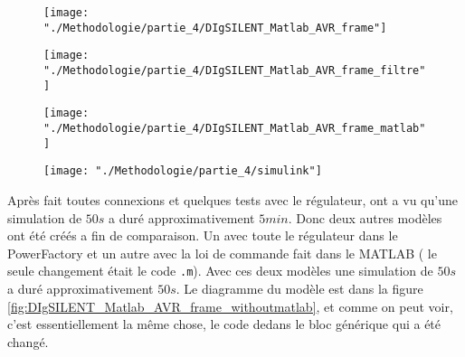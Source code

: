 \begin{minipage}{.475\textwidth}
	\begin{figure}[H]
		\begin{center}	
			\texttt{[image: "./Methodologie/partie\_4/DIgSILENT\_Matlab\_AVR\_frame"]}
			\caption{}
			\label{fig:DIgSILENT_Matlab_AVR_frame}
		\end{center}
	\end{figure}
\end{minipage}
\begin{minipage}{.475\textwidth}
	\begin{figure}[H]
		\begin{center}	
			\texttt{[image: "./Methodologie/partie\_4/DIgSILENT\_Matlab\_AVR\_frame\_filtre"]}
			\caption{}
			\label{fig:DIgSILENT_Matlab_AVR_frame_filtre}
		\end{center}
	\end{figure}
\end{minipage}

\begin{minipage}{.475\textwidth}
\begin{figure}[H]
	\begin{center}	
		\texttt{[image: "./Methodologie/partie\_4/DIgSILENT\_Matlab\_AVR\_frame\_matlab"]}
		\caption{}
		\label{fig:DIgSILENT_Matlab_AVR_frame_matlab}
	\end{center}
\end{figure}
\end{minipage}
\begin{minipage}{.475\textwidth}
\begin{figure}[H]
	\begin{center}	
		\texttt{[image: "./Methodologie/partie\_4/simulink"]}
		\caption{}
		\label{fig:simulink}
	\end{center}
\end{figure}
\end{minipage}
Après fait toutes connexions et quelques tests avec le régulateur, ont a vu qu'une simulation de $ 50s $ a duré approximativement $ 5min $. Donc deux autres modèles ont été créés a fin de comparaison. Un avec toute le régulateur dans le PowerFactory et un autre avec la loi de commande fait dans le MATLAB ( le seule changement était le code \verb|.m|). Avec ces deux modèles une simulation de $50s$ a duré approximativement $ 50s $. Le diagramme du modèle est dans la figure \ref{fig:DIgSILENT_Matlab_AVR_frame_withoutmatlab}, et comme on peut voir, c'est  essentiellement la même chose, le code dedans le bloc générique qui a été changé. 

